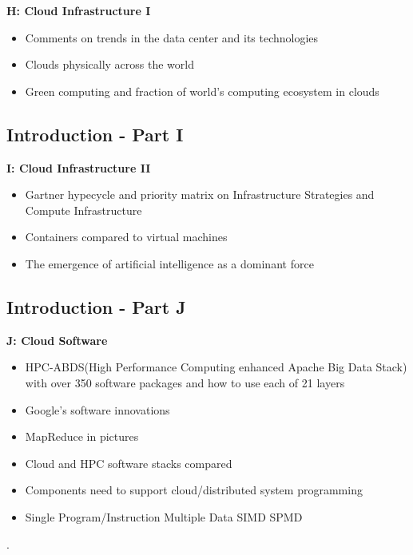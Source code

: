 
\textbf{H: Cloud Infrastructure I}
\begin{itemize}
\item Comments on trends in the data center and its technologies
\item Clouds physically across the world
\item Green computing and fraction of world’s computing ecosystem in
  clouds
\end{itemize}

\subsection{Introduction - Part I}\label{s:cloud-fundamentals-i}

\textbf{I: Cloud Infrastructure II}
\begin{itemize}
\item Gartner hypecycle and priority matrix on Infrastructure
  Strategies and Compute Infrastructure
\item Containers compared to virtual machines
\item The emergence of artificial intelligence as a dominant force
\end{itemize}

\subsection{Introduction - Part J}\label{s:cloud-fundamentals-j}

\textbf{J: Cloud Software}
\begin{itemize}
\item HPC-ABDS(High Performance Computing enhanced Apache Big Data
  Stack) with over 350 software packages and how to use each of 21
  layers
\item Google’s software innovations
\item MapReduce in pictures
\item Cloud and HPC software stacks compared
\item Components need to support cloud/distributed system programming
\item Single Program/Instruction Multiple Data SIMD SPMD
\end{itemize}.

